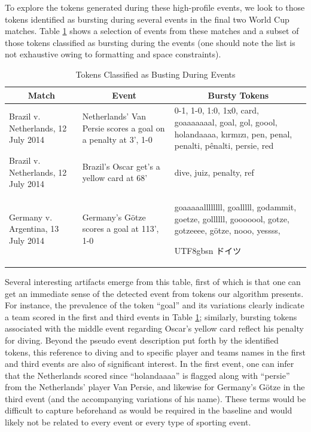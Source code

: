 \documentclass{sig-alternate}
\newcommand{\myfont}{gbsn}
\begin{document}
To explore the tokens generated during these high-profile events, we look to those tokens identified as bursting during several events in the final two World Cup matches.
Table \ref{tab:burstyTokens} shows a selection of events from these matches and a subset of those tokens classified as bursting during the events (one should note the list is not exhaustive owing to formatting and space constraints).

\begin{table}[htdp]
\caption{Tokens Classified as Busting During Events}
\begin{center}
\begin{tabular}{|p{0.75in}|p{0.7in}| p{1.45in} |}
\hline
\multicolumn{1}{|c|}{\textbf{Match}} & \multicolumn{1}{|c|}{\textbf{Event}} & \multicolumn{1}{|c|}{\textbf{Bursty Tokens}} \\ \hline
Brazil v. Netherlands, 12 July 2014 & Netherlands' Van Persie scores a goal on a penalty at 3', 1-0 & 0-1, 1-0, 1:0, 1x0, card, goaaaaaaal, goal, gol, goool, holandaaaa, k\i{}rm\i{}z\i{}, pen, penal, penalti, p\^{e}nalti, persie, red \\ \hline
Brazil v. Netherlands, 12 July 2014 & Brazil's Oscar get's a yellow card at 68' & dive, juiz, penalty, ref \\ \hline
Germany v. Argentina, 13 July 2014 & Germany's G\"{o}tze scores a goal at 113', 1-0 & goaaaaallllllll, goalllll, godammit, goetze, gollllll, gooooool, gotze, gotzeeee, g\"{o}tze, nooo, yessss, \begin{CJK}{UTF8}{\myfont} ドイツ\end{CJK} \\ \hline
\end{tabular}
\end{center}
\label{tab:burstyTokens}
\end{table}

Several interesting artifacts emerge from this table, first of which is that one can get an immediate sense of the detected event from tokens our algorithm presents. 
For instance, the prevalence of the token ``goal'' and its variations clearly indicate a team scored in the first and third events in Table \ref{tab:burstyTokens}; similarly, bursting tokens associated with the middle event regarding Oscar's yellow card reflect his penalty for diving.
Beyond the pseudo event description put forth by the identified tokens, this reference to diving and to specific player and teams names in the first and third events are also of significant interest.
In the first event, one can infer that the Netherlands scored since ``holandaaaa'' is flagged along with ``persie'' from the Netherlands' player Van Persie, and likewise for Germany's G\"{o}tze in the third event (and the accompanying variations of his name).
These terms would be difficult to capture beforehand as would be required in the baseline and would likely not be related to every event or every type of sporting event.
\end{document}
